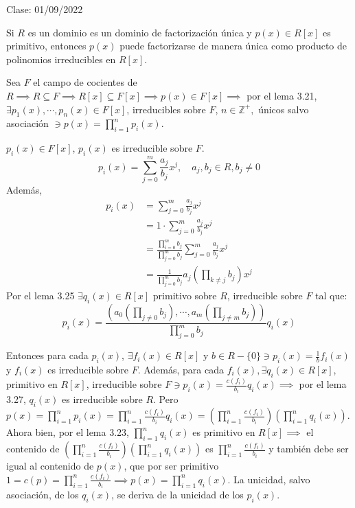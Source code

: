 Clase: 01/09/2022

\begin{lema}[3.28]
    Si $R$ es un dominio es un dominio de factorización única y $p(x)\in R[x]$ es primitivo, entonces $p(x)$ puede factorizarse de manera única como producto de polinomios irreducibles en $R[x]$.
    \begin{dem}
        Sea $F$ el campo de cocientes de $R\implies R\subseteq F\implies R[x]\subseteq F[x]\implies p(x)\in F[x]\implies$ por el lema 3.21, $\exists p_1(x),\cdots, p_n(x)\in F[x]$, irreducibles sobre $F$, $n\in\mathbb{Z}^+,$ únicos salvo asociación $\ni p(x)=\prod_{i=1}^n p_i(x)$. 

        \begin{cajita}
            $p_i(x)\in F[x]$, $p_i(x)$ es irreducible sobre $F$. 
            $$p_i(x)=\sum_{j=0}^m\frac{a_j}{b_j}x^j,\quad a_j,b_j\in R,b_j\neq0$$
            Además, 
            \begin{align*}
                p_i(x) & =\sum_{j=0}^m\frac{a_j}{b_j}x^j\\
                &= 1\cdot\sum_{j=0}^m\frac{a_j}{b_j}x^j\\ 
                &=\frac{\prod_{i=0}^m b_j}{\prod_{j=0}^m b_j}\sum_{j=0}^m \frac{a_j}{b_j}x^j\\
                &= \frac{1}{\prod_{j=0}^{m}b_j}a_j\left(\prod_{k\neq j}b_j\right)x^j
            \end{align*}
           Por el lema 3.25 $\exists q_i(x)\in R[x]$ primitivo sobre $R$, irreducible sobre $F$ tal que: 
           $$p_i(x)=\frac{\left(a_0(\prod_{j\neq 0}b_j),\cdots,a_m(\prod_{j\neq m}b_j)\right)}{\prod_{j=0}^m b_j}q_i(x)$$
        \end{cajita}
        Entonces para cada $p_i(x)$, $\exists f_i(x)\in R[x]$ y $b\in R-\{0\}\ni p_i(x)=\frac{1}{b}f_i(x)$ y $f_i(x)$ es irreducible sobre $F$. Además, para cada $f_i(x),\exists q_i(x)\in R[x]$, primitivo en $R[x]$, irreducible sobre $F\ni p_i(x)=\frac{c(f_i)}{b_i}q_i(x)\implies$ por el lema 3.27, $q_i(x)$ es irreducible sobre $R$. Pero $p(x)=\prod_{i=1}^n p_i(x)=\prod_{i=1}^n \frac{c(f_i)}{b_i}q_i(x)=\left(\prod_{i=1}^{n}\frac{c(f_i)}{b_i}\right)\left(\prod_{i=1}^n q_i(x)\right)$. Ahora bien, por el lema 3.23, $\prod_{i=1}^n q_i(x)$ es primitivo en $R[x]\implies$ el contenido de $\left(\prod_{i=1}^n \frac{c(f_i)}{b_i}\right)\left(\prod_{i=1}^n q_i(x)\right)$ es $\prod_{i=1}^n \frac{c(f_i)}{b_i}$ y también debe ser igual al contenido de $p(x)$, que por ser primitivo $1=c(p)=\prod_{i=1}^n \frac{c(f_i)}{b_i}\implies p(x)=\prod_{i=1}^nq_i(x)$. La unicidad, salvo asociación, de los $q_i(x)$, se deriva de la unicidad de los $p_i(x)$.  
    \end{dem}
\end{lema}

